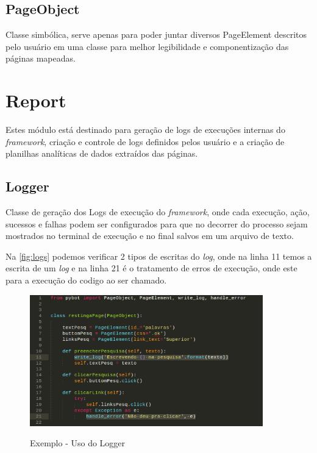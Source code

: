         \subsection{PageObject}
            Classe simbólica, serve apenas para poder juntar diversos PageElement descritos pelo usuário em uma classe para melhor
            legibilidade e componentização das páginas mapeadas.



    \section{Report}

        Estes módulo está destinado para geração de logs de execuções internas do \emph{framework}, criação e controle
        de logs definidos pelos usuário e a criação de planilhas analíticas de dados extraídos das páginas.

        \subsection{Logger}
        Classe de geração dos Logs de execução do \emph{framework}, onde cada execução, ação, sucessos e falhas podem ser configurados para que no decorrer do processo
        sejam mostrados no terminal de execução e no final salvos em um arquivo de texto.

        Na \autoref{fig:logs} podemos verificar 2 tipos de escritas do \emph{log}, onde na linha 11 temos a escrita de um \emph{log} e na linha 21 é o tratamento
        de erros de execução, onde este para a execução do codigo ao ser chamado.

        \begin{figure}[H]
            \vspace*{0,3cm}
            \centering
            \caption{Exemplo - Uso do Logger}
            \includegraphics[width=0.9\textwidth]{./04-figuras/logs}
            \label{fig:logs}
        \end{figure}
        \vspace*{-0,9cm}
        {\raggedright {}}

